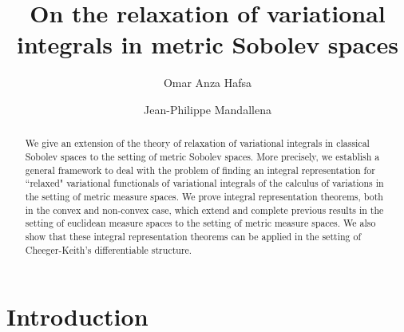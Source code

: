 \documentclass[10pt]{amsart}
\title[Relaxation of variational integrals in metric Sobolev spaces]{On the relaxation of variational integrals in metric Sobolev spaces}
\author{\sc Omar Anza Hafsa}
\author{Jean-Philippe Mandallena}
\numberwithin{equation}{section}
\theoremstyle{definition}
\theoremstyle{remark}
\begin{document}
\begin{abstract}
We give an extension of the theory of relaxation of variational integrals in classical Sobolev spaces to the setting of metric Sobolev spaces. More precisely, we establish a general framework to deal with the problem of finding an integral representation for  ``relaxed" variational functionals of variational integrals of the calculus of variations in the setting of metric measure spaces. We prove integral representation theorems, both in the convex and non-convex case, which extend and complete previous results in the setting of euclidean measure spaces to the  setting of metric measure spaces. We also show that these integral representation theorems can be applied in the setting of Cheeger-Keith's differentiable structure.

\end{abstract}

\maketitle

\section{Introduction}
\end{document}
